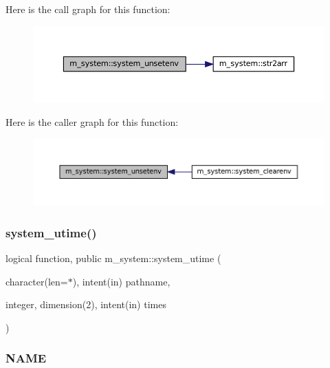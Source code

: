 Here is the call graph for this function\+:
\nopagebreak
\begin{figure}[H]
\begin{center}
\leavevmode
\includegraphics[width=350pt]{namespacem__system_a61b67b46b35490ec308773b65c3376a3_cgraph}
\end{center}
\end{figure}
Here is the caller graph for this function\+:
\nopagebreak
\begin{figure}[H]
\begin{center}
\leavevmode
\includegraphics[width=350pt]{namespacem__system_a61b67b46b35490ec308773b65c3376a3_icgraph}
\end{center}
\end{figure}
\mbox{\label{namespacem__system_a83a121ba0b525210b5217565569ef350}} 
\subsubsection{\texorpdfstring{system\+\_\+utime()}{system\_utime()}}
{\footnotesize\ttfamily logical function, public m\+\_\+system\+::system\+\_\+utime (\begin{DoxyParamCaption}\item[{character(len=$\ast$), intent(in)}]{pathname,  }\item[{integer, dimension(2), intent(in)}]{times }\end{DoxyParamCaption})}



\subsubsection*{N\+A\+ME}

